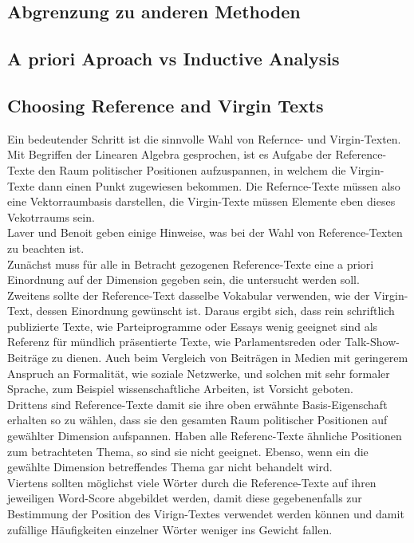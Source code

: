  

  \subsection{Abgrenzung zu anderen Methoden}
  \subsection{A priori Aproach vs Inductive Analysis}
  \subsection{Choosing Reference and Virgin Texts}
  Ein bedeutender Schritt ist die sinnvolle Wahl von Refernce- und Virgin-Texten. Mit Begriffen der Linearen Algebra gesprochen, ist es Aufgabe der Reference-Texte den Raum politischer Positionen aufzuspannen, in welchem die Virgin-Texte dann einen Punkt zugewiesen bekommen. Die Refernce-Texte müssen also eine Vektorraumbasis darstellen, die Virgin-Texte müssen Elemente eben dieses Vekotrraums sein. \\
  Laver und Benoit \cite{LuB} geben einige Hinweise, was bei der Wahl von Reference-Texten zu beachten ist. \\
  Zunächst muss für alle in Betracht gezogenen Reference-Texte eine a priori Einordnung auf der Dimension gegeben sein, die untersucht werden soll. \\
  Zweitens sollte der Reference-Text dasselbe Vokabular verwenden, wie der Virgin-Text, dessen Einordnung gewünscht ist. Daraus ergibt sich, dass rein schriftlich publizierte Texte, wie Parteiprogramme oder Essays wenig geeignet sind als Referenz für mündlich präsentierte Texte, wie Parlamentsreden oder Talk-Show-Beiträge zu dienen. Auch beim Vergleich von Beiträgen in Medien mit geringerem Anspruch an Formalität, wie soziale Netzwerke, und solchen mit sehr formaler Sprache, zum Beispiel wissenschaftliche Arbeiten, ist Vorsicht geboten. \\
  Drittens sind Reference-Texte damit sie ihre oben erwähnte Basis-Eigenschaft erhalten so zu wählen, dass sie den gesamten Raum politischer Positionen auf gewählter Dimension aufspannen. Haben alle Referenc-Texte ähnliche Positionen zum betrachteten Thema, so sind sie nicht geeignet. Ebenso, wenn ein die gewählte Dimension betreffendes Thema gar nicht behandelt wird.  \\
  Viertens sollten möglichst viele Wörter durch die Reference-Texte auf ihren jeweiligen Word-Score abgebildet werden, damit diese gegebenenfalls zur Bestimmung der Position des Virign-Textes verwendet werden können und damit zufällige Häufigkeiten einzelner Wörter weniger ins Gewicht fallen.  \\

